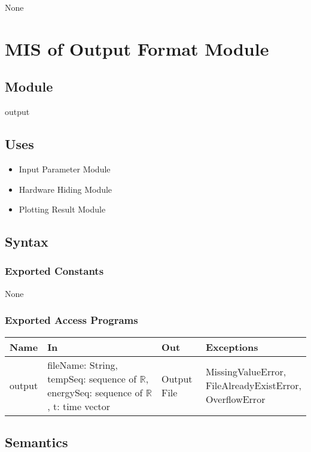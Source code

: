 \documentclass[12pt, titlepage]{article}
\begin{document}
None


\section{MIS of Output Format Module} \label{Output_Format_Module}

\subsection{Module}
output

\subsection{Uses}
\begin{itemize}
    \item Input Parameter Module 
    \item Hardware Hiding Module    
    \item Plotting Result Module
\end{itemize}

\subsection{Syntax}

\subsubsection{Exported Constants}
None 
\subsubsection{Exported Access Programs}


\begin{tabular}{p{2cm} p{5.5cm} p{3cm} p{3.5cm}}
\hline
\textbf{Name} & \textbf{In} & \textbf{Out} & \textbf{Exceptions} \\
\hline
output & \makecell[l]{fileName: String, \\ tempSeq: sequence of $\mathbb{R}$, \\ energySeq: sequence of $\mathbb{R}$, \\ t: time vector } & Output File & \makecell[l]{MissingValueError, \\ FileAlreadyExistError,  \\ OverflowError} \\
\hline
\end{tabular}

\subsection{Semantics}
\end{document}
